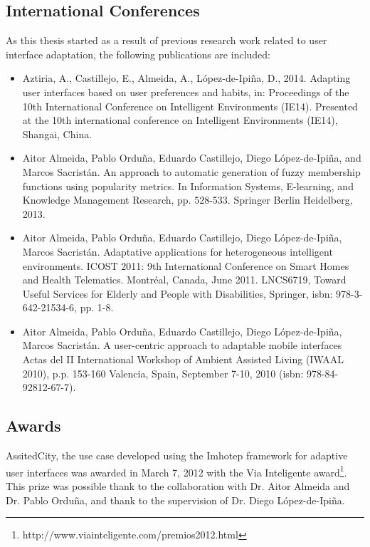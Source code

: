 \subsection{International Conferences}

As this thesis started as a result of previous research work related to user 
interface adaptation, the following publications are included:

\begin{itemize}
  \item Aztiria, A., Castillejo, E., Almeida, A., {López-de-Ipiña}, D., 2014. 
  Adapting user interfaces based on user preferences and habits, in: 
  Proceedings of the 10th International Conference on Intelligent Environments 
  (IE14). Presented at the 10th international conference on Intelligent 
  Environments (IE14), Shangai, China.


  \item Aitor Almeida, Pablo Orduña, Eduardo Castillejo, Diego {López-de-Ipiña}, 
  and Marcos Sacristán. An approach to automatic generation of fuzzy 
  membership functions using popularity metrics. In Information Systems, 
  E-learning, and Knowledge Management Research, pp. 528-533. Springer Berlin 
  Heidelberg, 2013.
  
  \item Aitor Almeida, Pablo Orduña, Eduardo Castillejo, Diego {López-de-Ipiña}, 
  Marcos Sacristán. Adaptative applications for heterogeneous intelligent 
  environments. ICOST 2011: 9th International Conference on Smart Homes and 
  Health Telematics. Montréal, Canada, June 2011. LNCS6719, Toward Useful 
  Services for Elderly and People with Disabilities, Springer, \ac{isbn}: 
  978-3-642-21534-6, pp. 1-8.
  
  \item Aitor Almeida, Pablo Orduña, Eduardo Castillejo, Diego {López-de-Ipiña}, 
  Marcos Sacristán. A user-centric approach to adaptable mobile interfaces 
  Actas del II International Workshop of Ambient Assisted Living (IWAAL 2010), 
  p.p. 153-160 Valencia, Spain, September 7-10, 2010 (\ac{isbn}: 978-84-92812-67-7).
\end{itemize}


\subsection{Awards}
\label{sec:awards}

AssitedCity, the use case developed using the Imhotep framework for adaptive
user interfaces was awarded in March 7, 2012 with the Via Inteligente 
award\footnote{http://www.viainteligente.com/premios2012.html}. This prize was 
possible thank to the collaboration with Dr. Aitor Almeida and Dr. Pablo Orduña, 
and thank to the supervision of Dr. Diego López-de-Ipiña. 
